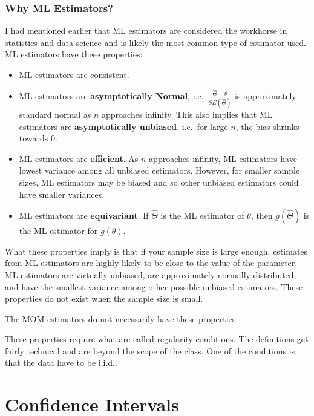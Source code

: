 \documentclass[
]{book}
\providecommand{\tightlist}{%
  \setlength{\itemsep}{0pt}\setlength{\parskip}{0pt}}
\begin{document}
\subsection{Why ML Estimators?}\label{why-ml-estimators}

I had mentioned earlier that ML estimators are considered the workhorse in statistics and data science and is likely the most common type of estimator used. ML estimators have these properties:

\begin{itemize}
\tightlist
\item
  ML estimators are consistent.
\item
  ML estimators are \textbf{asymptotically Normal}, i.e.~\(\frac{\hat{\Theta} - \theta}{SE(\hat{\Theta})}\) is approximately standard normal as \(n\) approaches infinity. This also implies that ML estimators are \textbf{asymptotically unbiased}, i.e.~for large \(n\), the bias shrinks towards 0.
\item
  ML estimators are \textbf{efficient}. As \(n\) approaches infinity, ML estimators have lowest variance among all unbiased estimators. However, for smaller sample sizes, ML estimators may be biased and so other unbiased estimators could have smaller variances.
\item
  ML estimators are \textbf{equivariant}. If \(\hat{\Theta}\) is the ML estimator of \(\theta\), then \(g(\hat{\Theta})\) is the ML estimator for \(g(\theta)\).
\end{itemize}

What these properties imply is that if your sample size is large enough, estimates from ML estimators are highly likely to be close to the value of the parameter, ML estimators are virtually unbiased, are approximately normally distributed, and have the smallest variance among other possible unbiased estimators. These properties do not exist when the sample size is small.

The MOM estimators do not necessarily have these properties.

These properties require what are called regularity conditions. The definitions get fairly technical and are beyond the scope of the class. One of the conditions is that the data have to be i.i.d..

\chapter{Confidence Intervals}\label{confidence-intervals}
\end{document}

